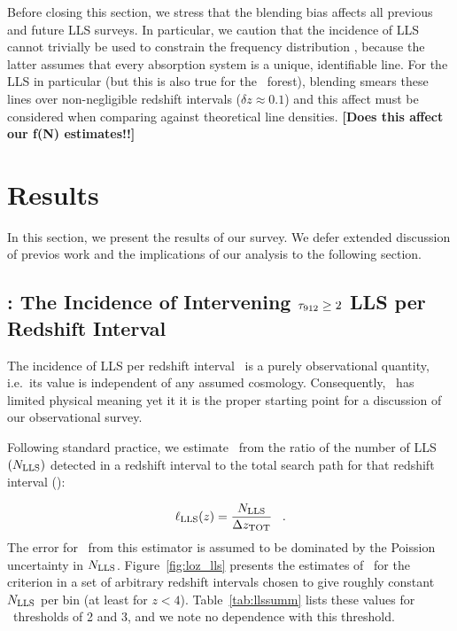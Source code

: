\documentclass[12pt,preprint]{aastex}
\begin{document}
Before closing this section, we stress that the blending bias
affects all previous and future LLS surveys.  In particular,
we caution that the incidence of LLS cannot trivially be
used to constrain the  frequency distribution \fnhi,
because the latter assumes that every absorption system is
a unique, identifiable line.  For the LLS in particular (but
this is also true for the \lya\ forest), blending smears these
lines over non-negligible redshift intervals ($\delta z \approx 0.1$)
and this affect must be considered when comparing against 
theoretical line densities.
{\bf [Does this affect our f(N) estimates!!]}




\section{Results}
\label{sec:results}

In this section, we present the results of our survey.  We
defer extended discussion of previos work and the implications
of our analysis to the following section.

\subsection{\lzlls: The Incidence of 
Intervening $\tau_{\rm 912} \ge 2$ LLS per Redshift Interval}
\label{sec:loz}

The incidence of LLS per redshift interval \lzlls\ 
is a purely observational quantity, i.e.\ its value 
is independent of any assumed cosmology.
Consequently, \lzlls\ has limited physical meaning yet it 
it is the proper starting point for a discussion
of our observational survey. 

Following standard
practice, we estimate \lzlls\ from the 
ratio of the number of LLS $(N_{\rm LLS})$
detected in a redshift interval to the total search path
for that redshift interval (\ztot):

\begin{equation}
\ell_{\rm{LLS}}(z) = \frac{N_{\rm LLS}}{\Delta z_{\rm TOT}}  \;\;\; .
\label{eqn:loz}
\end{equation}
The error for \lzlls\ from this estimator is assumed to be dominated
by the Poission uncertainty in $N_{\rm LLS}$.  Figure~\ref{fig:loz_lls}
presents the estimates of \lzlls\ for the \sna=2 criterion in
a set of arbitrary redshift intervals chosen to give roughly 
constant $N_{\rm LLS}$ per bin (at least for $z<4$).
Table~\ref{tab:llssumm} lists these values for \sna\ thresholds
of 2 and 3, and we note no dependence with this threshold.
\end{document}
